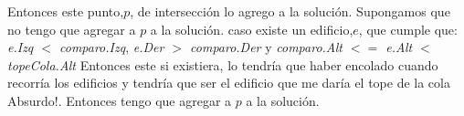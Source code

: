 \documentclass{article}
\begin{document}
                Entonces este punto,$p$, de intersección lo agrego a la solución.\newline
                Supongamos que no tengo que agregar a $p$ a la solución.\newline
                caso existe un edificio,$e$, que cumple que: \textit{e.Izq $<$ comparo.Izq}, \textit{e.Der $>$ comparo.Der} y \newline
                \textit{comparo.Alt $<=$ e.Alt $<$ topeCola.Alt} \newline
\color{red}{(grafico E)} \color{black} \newline          
                 Entonces este si existiera, lo tendría que haber encolado cuando recorría los edificios y tendría que ser el edificio que me daría el tope de la cola Absurdo!. Entonces tengo que agregar a $p$ a la solución.\newline
\end{document}
